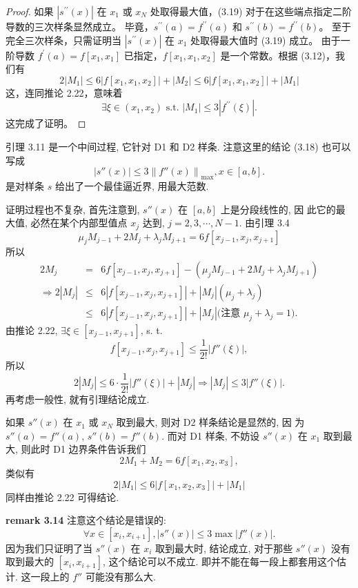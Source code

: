 \documentclass[a4paper]{ctexart}
\begin{document}
{\begin{proof}
如果 \(\left|s^{\prime\prime}(x)\right|\) 在 \(x_1\) 或 \(x_N\) 处取得最大值，(3.19) 对于在这些端点指定二阶导数的三次样条显然成立。
毕竟，\(s^{\prime\prime}(a) = f^{\prime\prime}(a)\) 和 \(s^{\prime\prime}(b) = f^{\prime\prime}(b)\)。
至于完全三次样条，只需证明当 \(\left|s^{\prime\prime}(x)\right|\) 在 \(x_1\) 处取得最大值时 (3.19) 成立。
由于一阶导数 \(f^{\prime}(a) = f[x_1, x_1]\) 已指定，\(f[x_1, x_1, x_2]\) 是一个常数。根据 (3.12)，我们有
\[ 
2 \left|M_1\right| \leq 6 \left|f[x_1, x_1, x_2]\right| + \left|M_2\right| \leq 6 \left|f[x_1, x_1, x_2]\right| + \left|M_1\right| 
\]
这，连同推论 2.22，意味着
\[ 
\exists \xi \in (x_1, x_2) \text{ s.t. } \left|M_1\right| \leq 3 \left|f^{\prime\prime}(\xi)\right|. 
\]
这完成了证明。
\end{proof}

引理 3.11 是一个中间过程, 它针对 D1 和 D2 样条. 注意这里的结论 (3.18) 也可以写成
$$
\left|s''(x)\right| \leq 3 \left\|f''(x)\right\|_{\max}, x \in [a,b].
$$
是对样条 $s$ 给出了一个最佳逼近界, 用最大范数.

证明过程也不复杂, 首先注意到, $s''(x)$ 在 $[a, b]$ 上是分段线性的, 因
此它的最大值, 必然在某个内部型值点 $x_j$ 达到, $j = 2, 3, \cdots, N - 1$. 由引理 3.4
$$
\mu_j M_{j - 1} + 2 M_j + \lambda_j M_{j + 1} = 6 f[x_{j - 1}, x_j, x_{j + 1}]
$$
所以
$$
\begin{array}{rcl}
  2 M_j &=& 6 f[x_{j - 1}, x_j, x_{j + 1}] - (\mu_j M_{j - 1} + 2 M_j + \lambda_j M_{j + 1}) \\
  \Rightarrow 2|M_j| &\leq& 6 |f[x_{j - 1}, x_j, x_{j + 1}]| + |M_j| (\mu_j + \lambda_j) \\
  &\leq&  6 |f[x_{j - 1}, x_j, x_{j + 1}]| + |M_j| \mbox{(注意 $\mu_j + \lambda_j = 1$)}.
\end{array}
$$
由推论 2.22, $\exists \xi \in [x_{j - 1}, x_{j + 1}]$, s. t.
$$
f[x_{j - 1}, x_j, x_{j + 1}] \leq \frac{1}{2!}\left|f''(\xi)\right|,
$$
所以
$$
2 |M_j| \leq 6 \cdot \frac{1}{2!}\left|f''(\xi)\right| + |M_j| \Rightarrow |M_j| \leq 3\left|f''(\xi)\right|.
$$
再考虑一般性, 就有引理结论成立.

如果 $s''(x)$ 在 $x_1$ 或 $x_N$ 取到最大, 则对 D2 样条结论是显然的, 因
为 $s''(a) = f''(a)$, $s''(b) = f''(b)$. 而对 D1 样条, 不妨设 $s''(x)$
在 $x_1$ 取到最大, 则此时 D1 边界条件告诉我们
$$
2M_1 + M_2 = 6 f[x_1, x_2, x_3],
$$
类似有
$$
2 |M_1| \leq 6|f[x_1, x_2, x_3]| + |M_1|
$$
同样由推论 2.22 可得结论.

{\bf remark 3.14} 注意这个结论是错误的:
$$
\forall x \in [x_i, x_{i + 1}], |s''(x)| \leq 3 \max |f''(x)|.
$$
因为我们只证明了当 $s''(x)$ 在 $x_i$ 取到最大时, 结论成立, 对于那些
$s''(x)$ 没有取到最大的 $[x_i, x_{i + 1}]$, 这个结论可以不成立.
即并不能在每一段上都套用这个估计. 这一段上的 $f''$ 可能没有那么大. 

}
\end{document}
